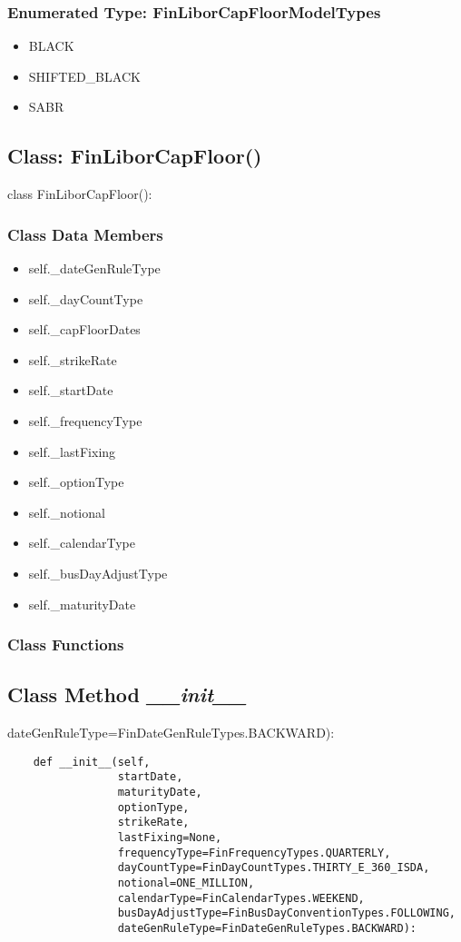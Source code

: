 \documentclass[twoside,11pt]{book}
\begin{document}
\subsubsection{Enumerated Type: FinLiborCapFloorModelTypes}
\begin{itemize}
\item{BLACK}
\item{SHIFTED\_BLACK}
\item{SABR}
\end{itemize}

\subsection{Class: FinLiborCapFloor()}
class FinLiborCapFloor():

\subsubsection{Class Data Members}
\begin{itemize}
\item{self.\_dateGenRuleType}
\item{self.\_dayCountType}
\item{self.\_capFloorDates}
\item{self.\_strikeRate}
\item{self.\_startDate}
\item{self.\_frequencyType}
\item{self.\_lastFixing}
\item{self.\_optionType}
\item{self.\_notional}
\item{self.\_calendarType}
\item{self.\_busDayAdjustType}
\item{self.\_maturityDate}
\end{itemize}

\subsubsection{Class Functions}

\subsection{Class Method {\it \_\_init\_\_}}
dateGenRuleType=FinDateGenRuleTypes.BACKWARD):

\begin{lstlisting}
    def __init__(self,
                 startDate,
                 maturityDate,
                 optionType,
                 strikeRate,
                 lastFixing=None,
                 frequencyType=FinFrequencyTypes.QUARTERLY,
                 dayCountType=FinDayCountTypes.THIRTY_E_360_ISDA,
                 notional=ONE_MILLION,
                 calendarType=FinCalendarTypes.WEEKEND,
                 busDayAdjustType=FinBusDayConventionTypes.FOLLOWING,
                 dateGenRuleType=FinDateGenRuleTypes.BACKWARD):
\end{lstlisting}
\end{document}
